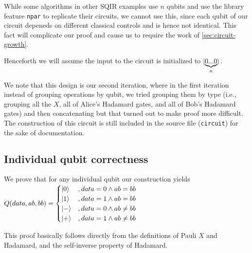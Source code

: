 \documentclass{article}
\begin{document}
While some algorithms in other SQIR examples use $n$ qubits and use the library feature \texttt{npar} to replicate their circuits, we cannot use this, since each qubit of our circuit depeneds on different classical controls and is hence not identical. This fact will complicate our proof and cause us to require the work of \cref{sec:circuit-growth}.


Henceforth we will assume the input to the circuit is initialized to $\ket{\underbrace{0...0}_n}$.

We note that this design is our second iteration, where in the first iteration instead of grouping operations by qubit, we tried grouping them by type (i.e., grouping all the $X$, all of Alice's Hadamard gates, and all of Bob's Hadamard gates) and then concatenating but that turned out to make proof more difficult. The construction of this circuit is still included in the source file (\texttt{circuit}) for the sake of documentation.

\subsection{Individual qubit correctness}\label{sec:qubit-correct}
We prove that for any individual qubit our construction yields 
$Q(data,ab,bb) = \begin{cases} 
\ket{0}&, data=0 \wedge ab=bb\\
\ket{1}&, data=1 \wedge ab=bb\\
\ket{-}&, data=0 \wedge ab \neq bb\\
\ket{+}&, data=1 \wedge ab \neq bb
\end{cases}
$

This proof basically follows directly from the definitions of Pauli $X$ and Hadamard, and the self-inverse property of Hadamard.
\end{document}
